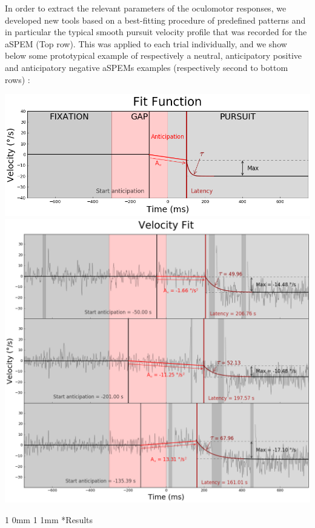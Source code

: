 \documentclass[profile,final,english, draft]{article}%
\makeatletter
\renewcommand{\section}{\@startsection
        {section}%
        {1}%
        {0mm}%
        {1\baselineskip}%
        {1mm}%
        {\large\color{red}\bfseries}}%
\makeatother
\begin{document}
\begin{multicols}{3}
In order to extract the relevant parameters of the oculomotor responses, we developed new tools based on a best-fitting procedure of predefined patterns and in particular the typical smooth pursuit velocity profile that was recorded for the aSPEM (Top row). This was applied to each trial individually, and we show below some prototypical example of respectively a neutral, anticipatory positive and anticipatory negative aSPEMs examples (respectively second to bottom rows) :

\begin{center} 
    \includegraphics[width=1\columnwidth]{Fonction_Fit}
    \includegraphics[width=1\columnwidth]{Fit_vitesse}
\end{center}

\section*{Results}


\end{multicols}
\end{document}
